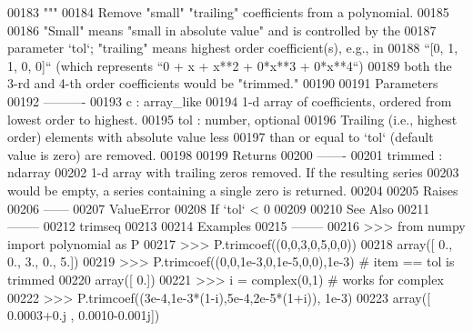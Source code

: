 \begin{DoxyCode}
00183     \textcolor{stringliteral}{"""}
00184 \textcolor{stringliteral}{    Remove "small" "trailing" coefficients from a polynomial.}
00185 \textcolor{stringliteral}{}
00186 \textcolor{stringliteral}{    "Small" means "small in absolute value" and is controlled by the}
00187 \textcolor{stringliteral}{    parameter `tol`; "trailing" means highest order coefficient(s), e.g., in}
00188 \textcolor{stringliteral}{    ``[0, 1, 1, 0, 0]`` (which represents ``0 + x + x**2 + 0*x**3 + 0*x**4``)}
00189 \textcolor{stringliteral}{    both the 3-rd and 4-th order coefficients would be "trimmed."}
00190 \textcolor{stringliteral}{}
00191 \textcolor{stringliteral}{    Parameters}
00192 \textcolor{stringliteral}{    ----------}
00193 \textcolor{stringliteral}{    c : array\_like}
00194 \textcolor{stringliteral}{        1-d array of coefficients, ordered from lowest order to highest.}
00195 \textcolor{stringliteral}{    tol : number, optional}
00196 \textcolor{stringliteral}{        Trailing (i.e., highest order) elements with absolute value less}
00197 \textcolor{stringliteral}{        than or equal to `tol` (default value is zero) are removed.}
00198 \textcolor{stringliteral}{}
00199 \textcolor{stringliteral}{    Returns}
00200 \textcolor{stringliteral}{    -------}
00201 \textcolor{stringliteral}{    trimmed : ndarray}
00202 \textcolor{stringliteral}{        1-d array with trailing zeros removed.  If the resulting series}
00203 \textcolor{stringliteral}{        would be empty, a series containing a single zero is returned.}
00204 \textcolor{stringliteral}{}
00205 \textcolor{stringliteral}{    Raises}
00206 \textcolor{stringliteral}{    ------}
00207 \textcolor{stringliteral}{    ValueError}
00208 \textcolor{stringliteral}{        If `tol` < 0}
00209 \textcolor{stringliteral}{}
00210 \textcolor{stringliteral}{    See Also}
00211 \textcolor{stringliteral}{    --------}
00212 \textcolor{stringliteral}{    trimseq}
00213 \textcolor{stringliteral}{}
00214 \textcolor{stringliteral}{    Examples}
00215 \textcolor{stringliteral}{    --------}
00216 \textcolor{stringliteral}{    >>> from numpy import polynomial as P}
00217 \textcolor{stringliteral}{    >>> P.trimcoef((0,0,3,0,5,0,0))}
00218 \textcolor{stringliteral}{    array([ 0.,  0.,  3.,  0.,  5.])}
00219 \textcolor{stringliteral}{    >>> P.trimcoef((0,0,1e-3,0,1e-5,0,0),1e-3) # item == tol is trimmed}
00220 \textcolor{stringliteral}{    array([ 0.])}
00221 \textcolor{stringliteral}{    >>> i = complex(0,1) # works for complex}
00222 \textcolor{stringliteral}{    >>> P.trimcoef((3e-4,1e-3*(1-i),5e-4,2e-5*(1+i)), 1e-3)}
00223 \textcolor{stringliteral}{    array([ 0.0003+0.j   ,  0.0010-0.001j])}

\end{DoxyCode}
